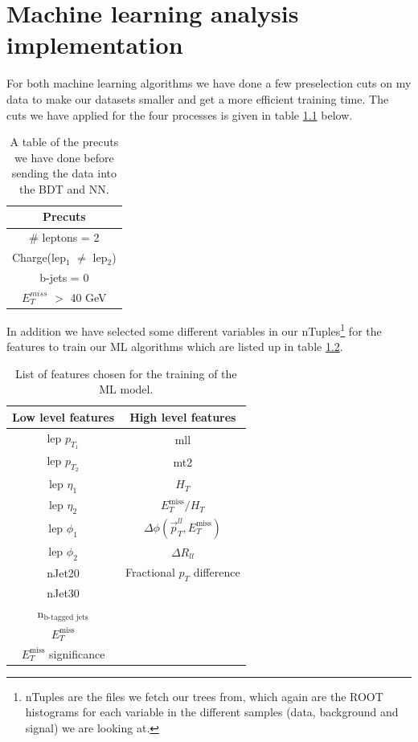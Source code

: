 \chapter{Machine learning analysis implementation}
\label{sec:MLanalysis}

For both machine learning algorithms we have done a few preselection cuts on my data to make our datasets smaller and get a more efficient training time. The cuts we have applied for the four processes is given in table \ref{tab:precutsSlepSlep} below.

\begin{table}[H]
    \centering
    \renewcommand{\arraystretch}{1.}
    \begin{tabular}{c}
    \toprule
    \textbf{Precuts}\\
    \midrule
    \midrule
        \# leptons = 2 \\
        Charge(lep$_1$ $\neq$ lep$_2$)\\
        b-jets = 0\\
        $E_T^{miss}$ $>$ 40 GeV\\
        \bottomrule
    \end{tabular}
    \caption{A table of the precuts we have done before sending the data into the BDT and NN.}
    \label{tab:precutsSlepSlep}
\end{table}

In addition we have selected some different variables in our nTuples\footnote{nTuples are the files we fetch our trees from, which again are the ROOT histograms for each variable in the different samples (data, background and signal) we are looking at.} for the features to train our ML algorithms which are listed up in table \ref{tab:features}.

\begin{table}[H]
    \centering
    \renewcommand{\arraystretch}{1.}
    \begin{tabular}{c c}
    \toprule
    \textbf{Low level features} & \textbf{High level features}\\
    \midrule
    \midrule
        lep $p_{T_1}$ & mll\\
        lep $p_{T_2}$ & mt2\\
        lep $\eta_1$ & $H_T$\\
        lep $\eta_2$ & $E_T^{\text{miss}}/H_T$\\
        lep $\phi_1$ & $\Delta \phi(\Vec{p}_T^{ll}, E_T^{\text{miss}})$\\
        lep $\phi_2$ & $\Delta R_{ll}$\\
        nJet20 & Fractional $p_T$ difference\\
        nJet30\\
        n$_{\text{b-tagged jets}}$\\
        $E_T^{\text{miss}}$\\
        $E_T^{\text{miss}}$ significance\\
        \bottomrule
    \end{tabular}
    \caption{List of features chosen for the training of the ML model.}
    \label{tab:features}
\end{table}

